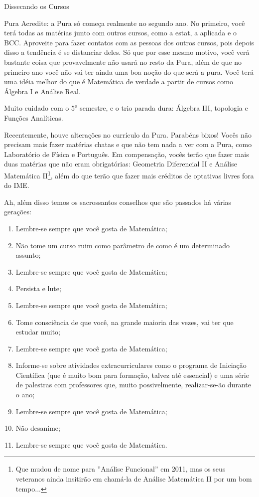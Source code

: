 \begin{secao}{Dissecando os Cursos}
\begin{subsecao}{Pura}
Acredite: a Pura só começa realmente no segundo ano. No primeiro, você terá todas as matérias junto com outros cursos, como a estat, a aplicada e o BCC. Aproveite para fazer contatos com as pessoas dos outros cursos, pois depois disso a tendência é se distanciar deles. Só que por esse mesmo motivo, você verá bastante coisa que provavelmente não usará no resto da Pura, além de que no primeiro ano você não vai ter ainda uma boa noção do que será a pura. Você terá uma idéia melhor do que é Matemática de verdade a partir de cursos como Álgebra I e Análise Real.

Muito cuidado com o $5^{o}$ semestre, e o trio parada dura: Álgebra III, topologia e Funções Analíticas.

Recentemente, houve alterações no currículo da Pura. Parabéns bixos! Vocês não precisam mais fazer matérias chatas e que não tem nada a ver com a Pura, como Laboratório de Física e Português. Em compensação, vocês terão que fazer mais duas matérias que não eram obrigatórias: Geometria Diferencial II e Análise Matemática II\footnote{Que mudou de nome para ''Análise Funcional'' em 2011, mas os seus veteranos ainda insitirão em chamá-la de Análise Matemática II por um bom tempo...}, além do que terão que fazer mais créditos de optativas livres fora do IME.

Ah, além disso temos os sacrossantos conselhos que são passados há várias gerações:
\begin{enumerate}
\item	Lembre-se sempre que você gosta de Matemática;
\item	Não tome um curso ruim como parâmetro de como é um determinado assunto;
\item	Lembre-se sempre que você gosta de Matemática;
\item	Persista e lute;
\item	Lembre-se sempre que você gosta de Matemática;
\item	Tome consciência de que você, na grande maioria das vezes, vai ter que estudar muito;
\item	Lembre-se sempre que você gosta de Matemática;
\item	Informe-se sobre atividades extracurriculares como o programa de Iniciação Científica (que é muito bom para formação, talvez até essencial) e uma série de palestras com professores que, muito possivelmente, realizar-se-ão durante o ano;
\item	Lembre-se sempre que você gosta de Matemática;
\item	Não desanime;
\item	Lembre-se sempre que você gosta de Matemática.


\end{enumerate}
\end{subsecao}
\end{secao}
